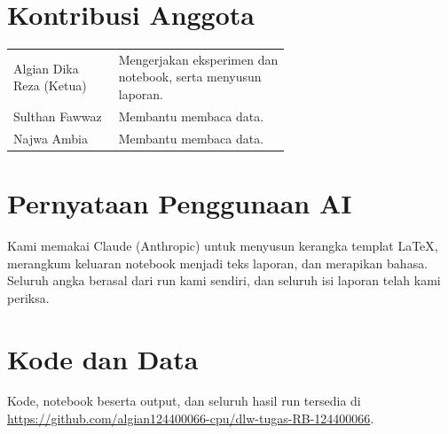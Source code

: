 \documentclass[conference,a4paper]{IEEEtran}
\begin{document}
\section*{Kontribusi Anggota}
\begin{tabular}{@{}lp{0.62\linewidth}@{}}
  Algian Dika Reza (Ketua) & Mengerjakan eksperimen dan notebook, serta menyusun laporan. \\
  Sulthan Fawwaz & Membantu membaca data. \\
  Najwa Ambia & Membantu membaca data. \\
\end{tabular}
 
\section*{Pernyataan Penggunaan AI}
Kami memakai Claude (Anthropic) untuk menyusun kerangka templat \LaTeX, merangkum keluaran notebook menjadi teks laporan, dan merapikan bahasa. Seluruh angka berasal dari run kami sendiri, dan seluruh isi laporan telah kami periksa.
 
\section*{Kode dan Data}
Kode, notebook beserta output, dan seluruh hasil run tersedia di \url{https://github.com/algian124400066-cpu/dlw-tugas-RB-124400066}.
 


 
\end{document}
